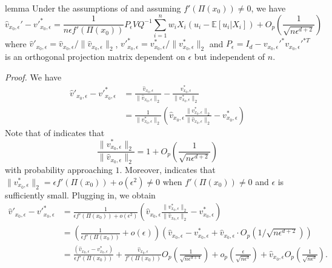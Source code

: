 \documentclass[11pt]{article}
\begin{document}
\begin{restatable}{lemma}{} \label{lemma: norm velocity decomp}
    Under the assumptions of  and assuming $f'(\Pi(x_0)) \neq 0$, we have
    \begin{equation}
        \hat{v}_{x_0, \epsilon}' - v'^*_{x_0, \epsilon} = \frac{1}{n\epsilon f'(\Pi(x_0))}P_\epsilon VQ^{-1}\sum_{i = 1}^nw_iX_i(u_i - \mathbb{E}[u_i|X_i]) +O_p\left(\frac{1}{\sqrt{n\epsilon^{d+2}}}\right)
    \end{equation}
    where $\hat{v}'_{x_0, \epsilon} = \hat{v}_{x_0, \epsilon}/\|\hat{v}_{x_0, \epsilon}\|_2$, $v'^*_{x_0, \epsilon} = v^*_{x_0, \epsilon}/\|v^*_{x_0, \epsilon}\|_2$ and $P_\epsilon = I_d - v_{x_0, \epsilon}'^{*}v_{x_0, \epsilon}'^{*T}$ is an orthogonal projection matrix dependent on $\epsilon$ but independent of $n$.
\end{restatable}
\noindent \textit{Proof.}  We have
\begin{align*}
    \hat{v}'_{x_0, \epsilon} - v'^*_{x_0, \epsilon} &= \frac{\hat{v}_{x_0, \epsilon}}{\|\hat{v}_{x_0, \epsilon}\|_2} - \frac{v^*_{x_0, \epsilon}}{\|v^*_{x_0, \epsilon}\|_2} \\
    &= \frac{1}{\|v^*_{x_0, \epsilon}\|_2}\left(\hat{v}_{x_0, \epsilon}\frac{\|v^*_{x_0, \epsilon}\|_2}{\|\hat{v}_{x_0, \epsilon}\|_2} - v^*_{x_0, \epsilon}\right)
\end{align*}
Note that  of  indicates that 
\[\frac{\|v^*_{x_0, \epsilon}\|_2}{\|\hat{v}_{x_0, \epsilon}\|_2} = 1 + O_p\left(\frac{1}{\sqrt{n\epsilon^{d+2}}}\right)\]
with probability approaching $1$. Moreover,  indicates that $\|v^*_{x_0, \epsilon}\|_2 = \epsilon f'(\Pi(x_0))+ o(\epsilon^2) \neq 0$ when $f'(\Pi(x_0)) \neq 0$ and $\epsilon$ is sufficiently small. Plugging in, we obtain
\begin{align*}
    \hat{v}'_{x_0, \epsilon} - v'^*_{x_0, \epsilon} &=\frac{1}{\epsilon f'(\Pi(x_0)) + o(\epsilon^2)}\left(\hat{v}_{x_0, \epsilon}\frac{\|v^*_{x_0, \epsilon}\|_2}{\|\hat{v}_{x_0, \epsilon}\|_2} - v^*_{x_0, \epsilon}\right) \\
    &= \left(\frac{1}{\epsilon f'(\Pi(x_0))}  + o(\epsilon)\right)\left(\hat{v}_{x_0, \epsilon} - v^*_{x_0, \epsilon} + \hat{v}_{x_0, \epsilon}\cdot O_p(1/\sqrt{n\epsilon^{d+2}})\right) \\
    &= \frac{(\hat{v}_{x_0, \epsilon} - v^*_{x_0, \epsilon})}{\epsilon f'(\Pi(x_0))} + \frac{\hat{v}_{x_0, \epsilon}}{f'(\Pi(x_0))}O_p\left(\frac{1}{\sqrt{n\epsilon^{d+4}}}\right) + o_p\left(\frac{\epsilon}{\sqrt{n\epsilon^{d}}}\right) +\hat{v}_{x_0, \epsilon}O_p\left(\frac{1}{\sqrt{n\epsilon^{d}}}\right).
\end{align*}
\end{document}
